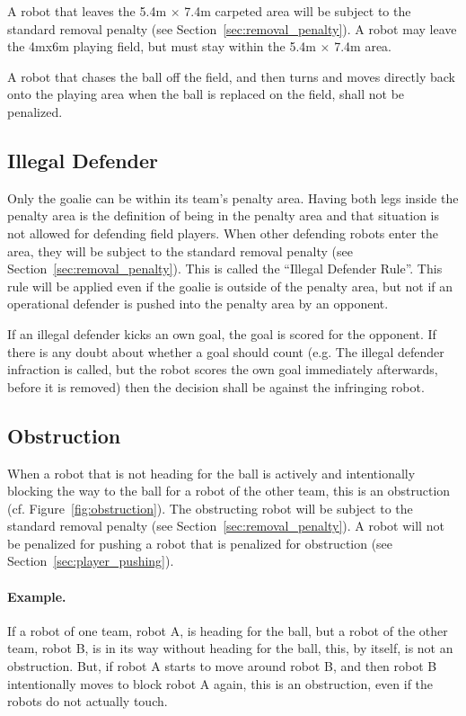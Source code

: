 \documentclass[12pt]{article}
\newcommand{\cf}{\mbox{cf.}\xspace}
\newcommand{\TotalWidth}{{5.4m }}
\newcommand{\TotalLength}{{7.4m }}
\begin{document}
A robot that leaves the \TotalWidth $\times$ \TotalLength carpeted area will be subject to the standard removal penalty (see
Section~\ref{sec:removal_penalty}).  A robot may leave the
4mx6m playing field, but must stay within the \TotalWidth $\times$ \TotalLength area.

A robot that chases the ball off the field, and then turns and moves
directly back onto the playing area when the ball is replaced on the
field, shall not be penalized.

\subsection{Illegal Defender}

Only the goalie can be within its team's penalty area. Having both
legs inside the penalty area is the definition of being in the
penalty area and that situation is not allowed for defending field
players.  When other defending robots enter the area, they will be
subject to the standard removal penalty (see
Section~\ref{sec:removal_penalty}).  This is called the ``Illegal
Defender Rule''.  This rule will be applied even if the goalie is
outside of the penalty area, but not if an operational defender is
pushed into the penalty area by an opponent.

If an illegal defender kicks an own goal, the goal is scored for the
opponent.  If there is any doubt about whether a goal should count
(e.g. The illegal defender infraction is called, but the robot scores
the own goal immediately afterwards, before it is removed) then the
decision shall be against the infringing robot.

\subsection{Obstruction}

 When a robot that is not heading for the ball is actively and
 intentionally blocking the way to the ball for a robot of the other
 team, this is an obstruction (\cf Figure~\ref{fig:obstruction}). The
 obstructing robot will be subject to the standard
 removal penalty (see Section~\ref{sec:removal_penalty}). A robot will not be penalized for pushing a robot that is penalized for obstruction (see Section~\ref{sec:player_pushing}).

 \paragraph{Example.} If a robot of one team, robot A, is heading for
 the ball, but a robot of the other team, robot B, is in its way without
 heading for the ball, this, by itself, is not an obstruction.  But,
 if robot A starts to move around robot B, and then robot B intentionally
 moves to block robot A again, this is an obstruction, even if the
 robots do not actually touch.
\end{document}
